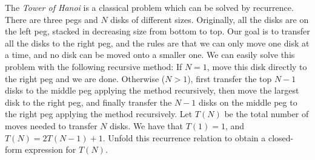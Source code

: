 The {\em Tower of Hanoi} is a classical problem which can be solved by
recurrence.  There are three pegs and $N$ disks of different sizes.
Originally, all the disks are on the left peg, stacked in decreasing
size from bottom to top. Our goal is to transfer all the disks to the
right peg, and the rules are that we can only move one disk at a time,
and no disk can be moved onto a smaller one. We can easily solve this
problem with the following recursive method:  If $N=1$, move this disk
directly to the right peg and we are done. Otherwise ($N>1$), first
transfer the top $N-1$ disks to the middle peg applying the method
recursively, then move the largest disk to the right peg, and finally
transfer the $N-1$ disks on the middle peg to the right peg applying
the method recursively. Let $T(N)$ be the total number of moves needed
to transfer $N$ disks.  We have that $T(1)=1$, and $T(N) = 2T(N-1) +
1$.  Unfold this recurrence relation to obtain a closed-form expression
for $T(N)$.
